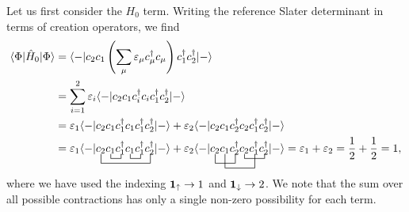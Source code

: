 \documentclass[a4paper]{article}
\newcommand{\nn}{\nonumber}
\renewcommand{\u}[1]{{\bf #1}_\uparrow}
\renewcommand{\d}[1]{{\bf #1}_\downarrow}
\begin{document}
Let us first consider the $H_0$ term. Writing the reference Slater determinant in terms of creation operators, we find
\begin{align}
\langle \Phi | \hat{H}_0 | \Phi \rangle &= \langle-| c_2c_1  \left(\sum_\mu \varepsilon_\mu c_\mu^\dagger c_\mu\right)  c_1^\dagger c_2^\dagger |-\rangle \nn\\
                                        &= \sum_{i=1}^2 \varepsilon_i \langle-| c_2c_1  c_i^\dagger c_i  c_1^\dagger c_2^\dagger |-\rangle \nn\\
                                        &= \varepsilon_1 \langle-| c_2c_1  c_1^\dagger c_1  c_1^\dagger c_2^\dagger |-\rangle + \varepsilon_2 \langle-| c_2c_1  c_2^\dagger c_2  c_1^\dagger c_2^\dagger |-\rangle \nn\\
                                        &= \varepsilon_1 \langle-| \bcontraction[2ex]{}{c_2}{c_1c_1^\dagger c_1c_1^\dagger}{c_2^\dagger}\bcontraction{c_2}{c_1}{}{c_1^\dagger}\bcontraction{c_2c_1c_1^\dagger}{c_1}{}{c_1^\dagger}c_2c_1c_1^\dagger c_1c_1^\dagger c_2^\dagger |-\rangle + \varepsilon_2 \langle-|\bcontraction[2ex]{}{c_2}{c_1}{c_2^\dagger}\bcontraction[3ex]{c_2}{c_1}{c_2^\dagger c_2}{c_1^\dagger}\bcontraction{c_2c_1c_2^\dagger}{c_2}{c_1^\dagger}{c_2^\dagger} c_2c_1c_2^\dagger c_2c_1^\dagger c_2^\dagger |-\rangle = \varepsilon_1+\varepsilon_2 = \frac{1}{2}+\frac{1}{2} = 1, \label{eq:4}
\end{align}
where we have used the indexing $\u{1}\rightarrow 1$ and $\d{1}\rightarrow 2$. We note that the sum over all possible contractions has only a single non-zero possibility for each term.
\end{document}
